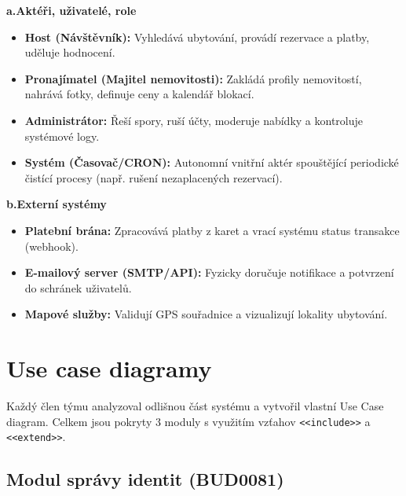 \documentclass[11pt, a4paper]{article}
\newcommand{\subsechead}[1]{%
  \vspace{0.35cm}%
  \noindent\textbf{\textcolor{mainblue!85!black}{#1}}\par%
  \vspace{0.1cm}%
}
\begin{document}
\subsechead{a.\enspace Aktéři, uživatelé, role}
\begin{itemize}
  \item \textbf{Host (Návštěvník):} Vyhledává ubytování, provádí rezervace a platby, uděluje hodnocení.
  \item \textbf{Pronajímatel (Majitel nemovitosti):} Zakládá profily nemovitostí, nahrává fotky, definuje ceny a kalendář blokací.
  \item \textbf{Administrátor:} Řeší spory, ruší účty, moderuje nabídky a kontroluje systémové logy.
  \item \textbf{Systém (Časovač/CRON):} Autonomní vnitřní aktér spouštějící periodické čistící procesy (např. rušení nezaplacených rezervací).
\end{itemize}

\subsechead{b.\enspace Externí systémy}
\begin{itemize}
  \item \textbf{Platební brána:} Zpracovává platby z karet a vrací systému status transakce (webhook).
  \item \textbf{E-mailový server (SMTP/API):} Fyzicky doručuje notifikace a potvrzení do schránek uživatelů.
  \item \textbf{Mapové služby:} Validují GPS souřadnice a vizualizují lokality ubytování.
\end{itemize}

\newpage

\section{Use case diagramy}

Každý člen týmu analyzoval odlišnou část systému a vytvořil vlastní Use Case diagram. Celkem jsou pokryty 3 moduly s využitím vzťahov \texttt{<<include>>} a \texttt{<<extend>>}.

\subsection{\textcolor{newblue}{Modul správy identit (BUD0081)}}
\end{document}

